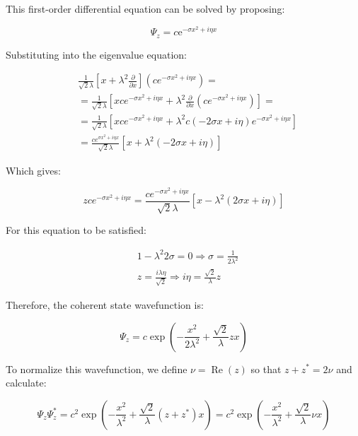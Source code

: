 This first-order differential equation can be solved by proposing:

\begin{equation}
\Psi_{z}=c \mathrm{e}^{-\sigma x^{2}+i \eta x}
\end{equation}

Substituting into the eigenvalue equation:

\begin{align}
& \frac{1}{\sqrt{2} \lambda}\left[x+\lambda^{2} \frac{\partial}{\partial x}\right]\left(c e^{-\sigma x^{2}+i \eta x}\right)= \\
& =\frac{1}{\sqrt{2} \lambda}\left[x c e^{-\sigma x^{2}+i \eta x}+\lambda^{2} \frac{\partial}{\partial x}\left(c e^{-\sigma x^{2}+i \eta x}\right)\right]= \\
& =\frac{1}{\sqrt{2} \lambda}\left[x c e^{-\sigma x^{2}+i \eta x}+\lambda^{2} c(-2 \sigma x+i \eta) e^{-\sigma x^{2}+i \eta x}\right]  \\
& =\frac{c e^{\sigma x^{2}+i \eta x}}{\sqrt{2} \lambda}\left[x+\lambda^{2}(-2 \sigma x+i \eta)\right]
\end{align}

Which gives:

\begin{equation}
z c e^{-\sigma x^{2}+i \eta x}=\frac{c e^{-\sigma x^{2}+i \eta x}}{\sqrt{2} \lambda}\left[x-\lambda^{2}(2 \sigma x+i \eta)\right]
\end{equation}

For this equation to be satisfied:

\begin{align}
& 1-\lambda^{2} 2 \sigma=0 \Longrightarrow \sigma=\frac{1}{2 \lambda^{2}} \\
& z=\frac{i \lambda \eta}{\sqrt{2}} \Longrightarrow i \eta=\frac{\sqrt{2}}{\lambda} z
\end{align}

Therefore, the coherent state wavefunction is:

\begin{equation}
\Psi_{z}=c \exp \left(-\frac{x^{2}}{2 \lambda^{2}}+\frac{\sqrt{2}}{\lambda} z x\right) \label{eq:7.53}
\end{equation}

To normalize this wavefunction, we define $\nu=\operatorname{Re}(z)$ so that $z+z^{*}=2 \nu$ and calculate:

\begin{equation}
\Psi_{z} \Psi_{z}^{*}=c^{2} \exp \left(-\frac{x^{2}}{\lambda^{2}}+\frac{\sqrt{2}}{\lambda}\left(z+z^{*}\right) x\right)=c^{2} \exp \left(-\frac{x^{2}}{\lambda^{2}}+\frac{\sqrt{2}}{\lambda} \nu x\right)
\end{equation}

